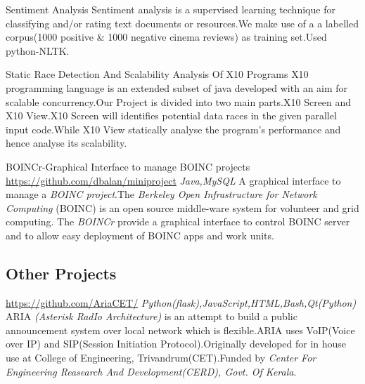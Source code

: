 \documentclass[11pt,a4paper,sans]{moderncv}
\begin{document}
{Sentiment Analysis}{}{}{}
{Sentiment analysis is a supervised learning technique for classifying and/or rating text documents or resources.We make use of a a labelled corpus(1000 positive \& 1000 negative cinema reviews) as training set.Used python-NLTK.\newline}

{Static Race Detection And Scalability Analysis Of X10 Programs}{}{}{}
{X10 programming language is an extended subset of java developed with an aim for
scalable concurrency.Our Project is divided into two main parts.X10 Screen and X10 View.X10 Screen will identifies potential data races in the given parallel input code.While X10 View statically analyse the program's performance and hence analyse its scalability.\newline}

{BOINCr-Graphical Interface to manage BOINC projects}
{\newline \url{https://github.com/dbalan/miniproject}}{}
{\hfill \textit{Java,MySQL}}
{A graphical interface to manage a \textit{BOINC project}.The \textit{Berkeley Open Infrastructure for Network Computing }(BOINC) is an open source middle-ware system for volunteer and grid computing. The \textit{BOINCr} provide a graphical interface to control BOINC server and to allow easy deployment of BOINC apps and work units.\newline}

\subsection{Other Projects}

{\newline \url{https://github.com/AriaCET/}\newline}{}
{\hfill \textit{Python(flask),JavaScript,HTML,Bash,Qt(Python)}}
{ARIA \textit{(Asterisk RadIo Architecture)} is an attempt to build a public announcement system over local network which is flexible.ARIA uses VoIP(Voice over IP) and SIP(Session Initiation Protocol).Originally developed for in house use at College of Engineering, Trivandrum(CET).Funded by \textit{Center For Engineering Reasearch And Development(CERD), Govt. Of Kerala}.\newline}
\end{document}
